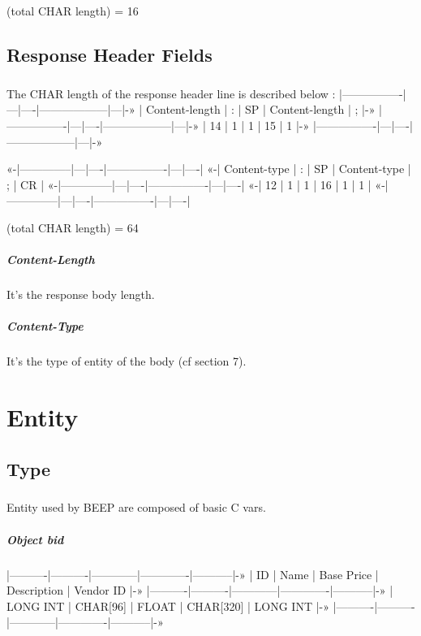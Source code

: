    (total CHAR length) = 16
    \section{Response Header Fields}
        \paragraph{}
   The CHAR length of the response header line is described below :
   |----------------|---|----|------------------|---|-»
   | Content-length | : | SP | {Content-length} | ; |-»
   |----------------|---|----|------------------|---|-»
   |       14       | 1 |  1 |        15        | 1 |-»
   |----------------|---|----|------------------|---|-»

   «-|--------------|---|----|----------------|---|----|
   «-| Content-type | : | SP | {Content-type} | ; | CR |
   «-|--------------|---|----|----------------|---|----|
   «-|      12      | 1 |  1 |       16       | 1 |  1 |
   «-|--------------|---|----|----------------|---|----|

   (total CHAR length) = 64
        \paragraph{Content-Length}
   It's the response body length.
        \paragraph{Content-Type}
   It's the type of entity of the body (cf section 7).


    \clearpage
\chapter{Entity}
    \section{Type}
        \paragraph{}
   Entity used by BEEP are composed of basic C vars.
        \paragraph{Object bid}
   |----------|----------|------------|-------------|-----------|-»
   |    ID    |   Name   | Base Price | Description | Vendor ID |-»
   |----------|----------|------------|-------------|-----------|-»
   | LONG INT | CHAR[96] |    FLOAT   |  CHAR[320]  |  LONG INT |-»
   |----------|----------|------------|-------------|-----------|-»

